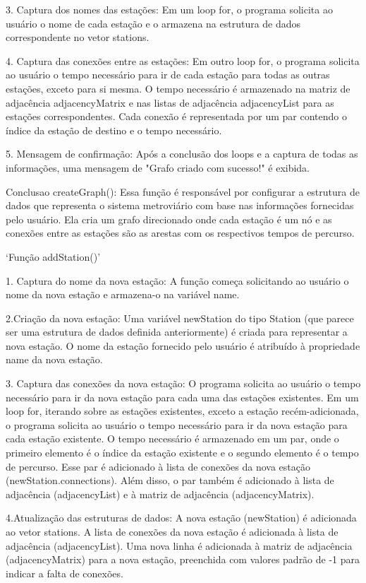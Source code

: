 3. Captura dos nomes das estações:
Em um loop for, o programa solicita ao usuário o nome de cada estação e o armazena na estrutura de dados correspondente no vetor stations.

4. Captura das conexões entre as estações:
Em outro loop for, o programa solicita ao usuário o tempo necessário para ir de cada estação para todas as outras estações, exceto para si mesma.
O tempo necessário é armazenado na matriz de adjacência adjacencyMatrix e nas listas de adjacência adjacencyList para as estações correspondentes.
Cada conexão é representada por um par contendo o índice da estação de destino e o tempo necessário.

5. Mensagem de confirmação:
Após a conclusão dos loops e a captura de todas as informações, uma mensagem de "Grafo criado com sucesso!" é exibida.

Conclusao createGraph():
Essa função é responsável por configurar a estrutura de dados que representa o sistema metroviário com base nas informações fornecidas pelo usuário.
Ela cria um grafo direcionado onde cada estação é um nó e as conexões entre as estações são as arestas com os respectivos tempos de percurso.

`Função addStation()'

1. Captura do nome da nova estação:
A função começa solicitando ao usuário o nome da nova estação e armazena-o na variável name.

2.Criação da nova estação:
Uma variável newStation do tipo Station (que parece ser uma estrutura de dados definida anteriormente) 
é criada para representar a nova estação.
O nome da estação fornecido pelo usuário é atribuído à propriedade name da nova estação.

3. Captura das conexões da nova estação:
O programa solicita ao usuário o tempo necessário para ir da nova estação para cada uma das estações existentes.
Em um loop for, iterando sobre as estações existentes, exceto a estação recém-adicionada, o programa solicita ao usuário o tempo necessário para ir da nova estação para cada estação existente.
O tempo necessário é armazenado em um par, onde o primeiro elemento é o índice da estação existente e o segundo elemento é o tempo de percurso.
Esse par é adicionado à lista de conexões da nova estação (newStation.connections).
Além disso, o par também é adicionado à lista de adjacência (adjacencyList) e à matriz de adjacência (adjacencyMatrix).

4.Atualização das estruturas de dados:
A nova estação (newStation) é adicionada ao vetor stations.
A lista de conexões da nova estação é adicionada à lista de adjacência (adjacencyList).
Uma nova linha é adicionada à matriz de adjacência (adjacencyMatrix) para a nova estação, preenchida com valores padrão de -1 para indicar a falta de conexões.


